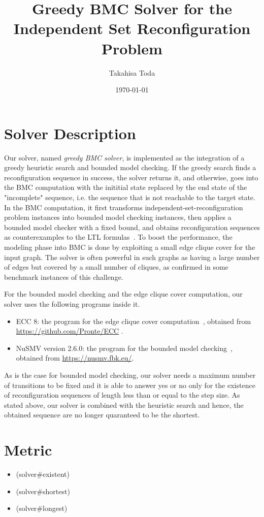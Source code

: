 \documentclass{article}
\date{\today}
\title{Greedy BMC Solver for the Independent Set Reconfiguration Problem}
\author[1]{Takahisa Toda}
\affil[1]{Graduate School of Informatics and Engineering, The University of Electro-Communications}
\begin{document}
\maketitle

\section{Solver Description}
Our solver, named \emph{greedy BMC solver}, is implemented as the integration of a greedy heuristic search and bounded model checking.  
If the greedy search finds a reconfiguration sequence in success, the solver returns it, and otherwise, goes into the BMC computation with the inititial state replaced by the end state of the "incomplete" sequence, i.e. the sequence that is not reachable to the target state.
In the BMC computation, it first transforms independent-set-reconfiguration problem instances into bounded model checking instances, then applies a bounded model checker with a fixed bound, and obtains reconfiguration sequences as counterexamples to the LTL formulas~\cite{weko_216133_1}.
To boost the performance, the modeling phase into BMC is done by exploiting a small edge clique cover for the input graph.
The solver is often powerful in such graphs as having a large number of edges but covered by a small number of cliques, as confirmed in some benchmark instances of this challenge.

For the bounded model checking and the edge clique cover computation, our solver uses the following programs inside it.
\begin{itemize}
\item ECC 8: the program for the edge clique cover computation~\cite{CONTE2020104464}, obtained from \url{https://github.com/Pronte/ECC} .
\item NuSMV version 2.6.0: the program for the bounded model checking~\cite{CAV02}, obtained from \url{https://nusmv.fbk.eu/}.
\end{itemize}

As is the case for bounded model checking, our solver needs a maximum number of transitions to be fixed and it is able to answer yes or no only for the existence of reconfiguration sequences of length less than or equal to the step size.
As stated above, our solver is combined with the heuristic search and hence, the obtained sequence are no longer quaranteed to be the shortest.

\section{Metric}
\begin{itemize}
\item (solver\#existent) 
\item (solver\#shortest)
\item (solver\#longest) 
\end{itemize}
\end{document}
